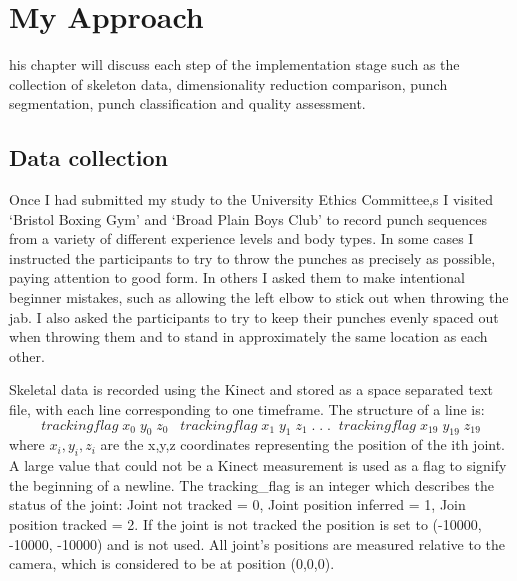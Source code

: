 %
%
\let\textcircled=\pgftextcircled
\chapter{My Approach}
\label{chap:intro}

his chapter will discuss each step of the implementation stage such as the collection of skeleton data, dimensionality reduction comparison, punch segmentation, punch classification and quality assessment.



\section{Data collection}
Once I had submitted my study to the University Ethics Committee,s I visited `Bristol Boxing Gym' and `Broad Plain Boys Club' to record punch sequences from a variety of different experience levels and body types. In some cases I instructed the participants to try to throw the punches as precisely as possible, paying attention to good form. In others I asked them to make intentional beginner mistakes, such as allowing the left elbow to stick out when throwing the jab. I also asked the participants to try to keep their punches evenly spaced out when throwing them and to stand in approximately the same location as each other.

Skeletal data is recorded using the Kinect and stored as a space separated text file, with each line corresponding to one timeframe. The structure of a line is: 
$$trackingflag\;x_0\;y_0\;z_0\;\;\;trackingflag\;x_1\;y_1\;z_1\;.\;.\;.\;\;trackingflag\;x_{19}\;y_{19}\;z_{19}$$
where $x_i,y_i,z_i$ are the x,y,z coordinates representing the position of the ith joint.
A large value that could not be a Kinect measurement is used as a flag to signify the beginning of a newline. The tracking_flag is an integer which describes the status of the joint:\newline
Joint not tracked = 0, Joint position inferred = 1, Join position tracked = 2.\newline
If the joint is not tracked the position is set to (-10000, -10000, -10000) and is not used. All joint's positions are measured relative to the camera, which is considered to be at position (0,0,0).

